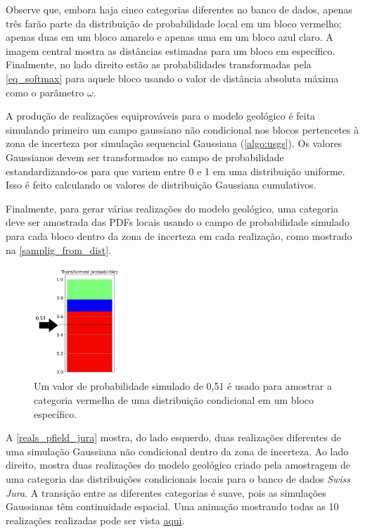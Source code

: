 Observe que, embora haja cinco categorias diferentes no banco de dados, apenas três farão parte da distribuição de probabilidade local em um bloco vermelho; apenas duas em um bloco amarelo e apenas uma em um bloco azul claro. A imagem central mostra as distâncias estimadas para um bloco em específico. Finalmente, no lado direito estão as probabilidades transformadas pela \autoref{eq_softmax} para aquele bloco usando o valor de distância absoluta máxima como o parâmetro $\omega$.

A produção de realizações equiprováveis para o modelo geológico é feita simulando primeiro um campo gaussiano não condicional nos blocos pertencetes à zona de incerteza por simulação sequencial Gaussiana (\autoref{algo:usgs}). Os valores Gaussianos devem ser transformados no campo de probabilidade estandardizando-os para que variem entre 0 e 1 em uma distribuição uniforme. Isso é feito calculando os valores de distribuição Gaussiana cumulativos.

Finalmente, para gerar várias realizações do modelo geológico, uma categoria deve ser amostrada das PDFs locais usando o campo de probabilidade simulado para cada bloco dentro da zona de incerteza em cada realização, como mostrado na \autoref{samplig_from_dist}.

\begin{figure}[H]
	\caption{\label{samplig_from_dist} Um valor de probabilidade simulado de 0,51 é usado para amostrar a categoria vermelha de uma distribuição condicional em um bloco específico.}
	\centering
		\includegraphics[width=0.3\textwidth]{capitulo_3/imagens/sampling_from_dist.png}
\end{figure}

A \autoref{reals_pfield_jura} mostra, do lado esquerdo, duas realizações diferentes de uma simulação Gaussiana não condicional dentro da zona de incerteza. Ao lado direito, mostra duas realizações do modelo geológico criado pela amostragem de uma categoria das distribuições condicionais locais para o banco de dados \textit{Swiss Jura}. A transição entre as diferentes categorias é suave, pois as simulações Gaussianas têm continuidade espacial. Uma animação mostrando todas as 10 realizações realizadas pode ser vista \href{https://github.com/robertorolo/assessing_geological_model_uncertainty_with_probability_fields/blob/main/jura_gif.gif}{aqui}.

